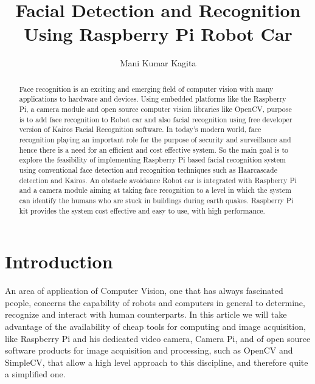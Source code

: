 \documentclass[sigconf]{acmart}
\begin{document}
\title{Facial Detection and Recognition Using Raspberry Pi Robot Car}

\author{Mani Kumar Kagita}


\begin{abstract}
Face recognition is an exciting and emerging field of computer vision with many  applications to hardware and devices. Using embedded platforms like the Raspberry Pi, a camera module and open source computer vision libraries like OpenCV, purpose is to add face recognition to Robot car and also facial recognition using free developer version of Kairos Facial Recognition software.
In today's modern world, face recognition playing an important role for the purpose of security and surveillance and hence there is a need for an efficient and cost effective system. So the main goal is to explore the feasibility of implementing Raspberry Pi based facial recognition system using conventional face detection and recognition techniques such as Haarcascade detection and Kairos. An obstacle avoidance Robot car is integrated with Raspberry Pi and a camera module aiming at taking face recognition to a level in which the system can identify the humans who are stuck in buildings during earth quakes.  Raspberry Pi kit provides the system cost effective and easy to use, with high performance.

\end{abstract}


\maketitle

\section{Introduction}
An area of application of Computer Vision, one that has always fascinated people, concerns the capability of robots and computers in general to determine, recognize and interact with human counterparts. In this article we will take advantage of the availability of cheap tools for computing and image acquisition, like Raspberry Pi and his dedicated video camera, Camera Pi, and of open source software products for image acquisition and processing, such as OpenCV and SimpleCV, that allow a high level approach to this discipline, and therefore quite a simplified one.
\end{document}
